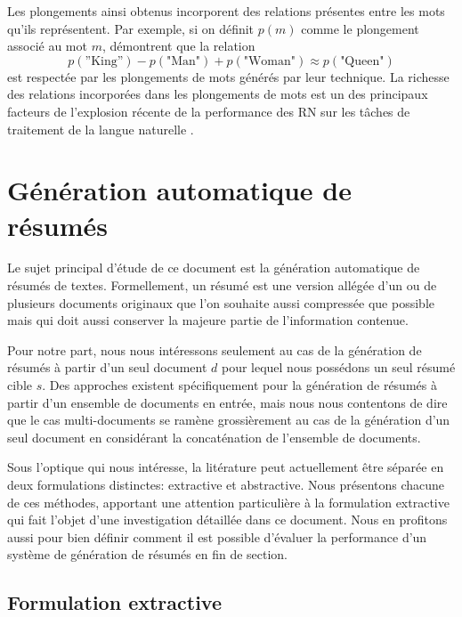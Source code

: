 Les plongements ainsi obtenus incorporent des relations 
présentes entre les mots qu'ils représentent.
Par exemple, si on définit $p(m)$ comme le plongement 
associé au mot $m$, \citet{NIPS2013_9aa42b31} démontrent 
que la relation 
\begin{equation*}
    p(\text{”King”}) - p(\text{"Man"}) + p(\text{"Woman"}) \approx p(\text{"Queen"})
\end{equation*}
est respectée par les plongements de mots générés par leur technique.
La richesse des relations incorporées dans les plongements de mots 
est un des principaux facteurs de l'explosion récente de la performance des 
RN sur les tâches de traitement de la langue naturelle \citep{almeida2019word}.

\section{Génération automatique de résumés}

Le sujet principal d'étude de ce document est la génération automatique 
de résumés de textes.
Formellement, un résumé est une version allégée d'un ou de plusieurs 
documents originaux que l'on souhaite aussi compressée que 
possible mais qui doit aussi conserver la majeure 
partie de l'information contenue.

Pour notre part, nous nous intéressons seulement au cas de la génération de résumés à partir
d'un seul document $d$ pour lequel nous possédons un seul résumé cible $s$.
Des approches existent spécifiquement pour la génération de résumés
à partir d'un ensemble de documents en entrée, mais nous nous contentons
de dire que le cas multi-documents se ramène grossièrement au cas de la génération d'un seul
document en considérant la concaténation de l'ensemble de documents.

Sous l'optique qui nous intéresse, la litérature peut actuellement être 
séparée en deux formulations distinctes: extractive et abstractive.
Nous présentons chacune de ces méthodes, apportant une attention 
particulière à la formulation extractive qui fait l'objet 
d'une investigation détaillée dans ce document.
Nous en profitons aussi pour bien définir comment il est possible 
d'évaluer la performance d'un système de génération de résumés 
en fin de section.

\subsection{Formulation extractive}
\label{sec:extractive}

